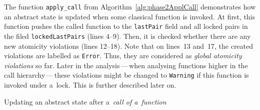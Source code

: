 The function \texttt{apply\_call} from Algorithm~\ref{alg:phase2ApplCall} demonstrates how an abstract state is updated when some classical function is invoked. At first, this function pushes the called function to the \texttt{lastPair} field and all locked pairs in the filed \texttt{lockedLastPairs} (lines 4--9). Then, it is checked whether there are any new atomicity violations (lines 12--18). Note that on lines~13 and~17, the created violations are labelled as \texttt{Error}. Thus, they are considered as \emph{global atomicity violations} so far. Later in the analysis\,---\,when analysing functions higher in the call hierarchy\,---\,these violations might be changed to \texttt{Warning} if this function is invoked under a~lock. This is further described later on.

\begin{algorithm}[hbt]
%
%
    \caption{Updating an abstract state after a~\emph{call of a~function}}
    \label{alg:phase2ApplCall}
\end{algorithm}

